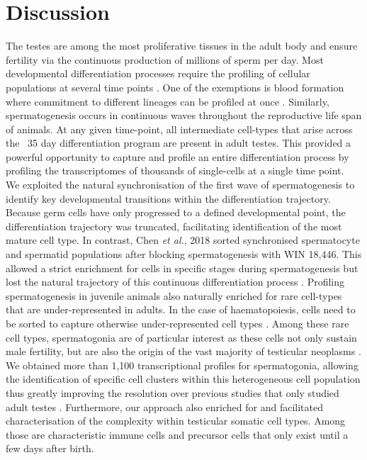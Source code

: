 
\section{Discussion}

The testes are among the most proliferative tissues in the adult body and ensure fertility via the continuous production of millions of sperm per day. Most developmental differentiation processes require the profiling of cellular populations at several time points \citep{Kernfeld2018, Scialdone2016, Wagner2018}. One of the exemptions is blood formation where commitment to different lineages can be profiled at once \citep{Dahlin2018}. Similarly, spermatogenesis occurs in continuous waves throughout the reproductive life span of animals. At any given time-point, all intermediate cell-types that arise across the ~35 day differentiation program are present in adult testes. This provided a powerful opportunity to capture and profile an entire differentiation process by profiling the transcriptomes of thousands of single-cells at a single time point. \\

We exploited the natural synchronisation of the first wave of spermatogenesis to identify key developmental transitions within the differentiation trajectory. Because germ cells have only progressed to a defined developmental point, the differentiation trajectory was truncated, facilitating identification of the most mature cell type.
In contrast, Chen \emph{et al.}, 2018 sorted synchronised spermatocyte and spermatid populations after blocking spermatogenesis with WIN 18,446. This allowed a strict enrichment for cells in specific stages during spermatogenesis but lost the natural trajectory of this continuous differentiation process \citep{Chen2018}. Profiling spermatogenesis in juvenile animals also naturally enriched for rare cell-types that are under-represented in adults. In the case of haematopoiesis, cells need to be sorted to capture otherwise under-represented cell types \citep{Dahlin2018}. Among these rare cell types, spermatogonia are of particular interest as these cells not only sustain male fertility, but are also the origin of the vast majority of testicular neoplasms \citep{Bosl1997}. We obtained more than 1,100 transcriptional profiles for spermatogonia, allowing the identification of specific cell clusters within this heterogeneous cell population thus greatly improving the resolution over previous studies that only studied adult testes \citep{Lukassen2018}. Furthermore, our approach also enriched for and facilitated characterisation of the complexity within testicular somatic cell types. Among those are characteristic immune cells and precursor cells that only exist until a few days after birth.\\


